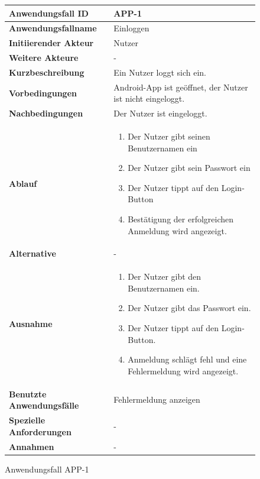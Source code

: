 \newpage

\begin{figure}[h]
	\centering
	\begin{tabularx}{\textwidth}{ X | X }
		\textbf{Anwendungsfall ID} & APP-1 \\ \hline
		\textbf{Anwendungsfallname} & Einloggen \\ \hline
		\textbf{Initiierender Akteur} & Nutzer \\ \hline
		\textbf{Weitere Akteure} & -  \\ \hline
		\textbf{Kurzbeschreibung} & Ein Nutzer loggt sich ein. \\ \hline
		\textbf{Vorbedingungen} & Android-App ist geöffnet, der Nutzer ist nicht eingeloggt. \\ \hline
		\textbf{Nachbedingungen} & Der Nutzer ist eingeloggt. \\ \hline
		\textbf{Ablauf} &
			\begin{enumerate}
				\item Der Nutzer gibt seinen Benutzernamen ein
				\item Der Nutzer gibt sein Passwort ein
				\item Der Nutzer tippt auf den Login-Button
				\item Bestätigung der erfolgreichen Anmeldung wird angezeigt.
			\end{enumerate} \\ \hline
		\textbf{Alternative} &
				- \\ \hline
		\textbf{Ausnahme} &
				\begin{enumerate}
					\item Der Nutzer gibt den Benutzernamen ein.
					\item Der Nutzer gibt das Passwort ein.
					\item Der Nutzer tippt auf den Login-Button.
					\item Anmeldung schlägt fehl und eine Fehlermeldung wird angezeigt.
				\end{enumerate}  \\ \hline
		\textbf{Benutzte Anwendungsfälle} & Fehlermeldung anzeigen \\ \hline
		\textbf{Spezielle Anforderungen} & - \\ \hline
		\textbf{Annahmen} & -
	\end{tabularx}
	\caption{Anwendungsfall APP-1}
	\label{fig:anwendungsfall-app-tabelle-APP-1}
\end{figure}

\newpage

